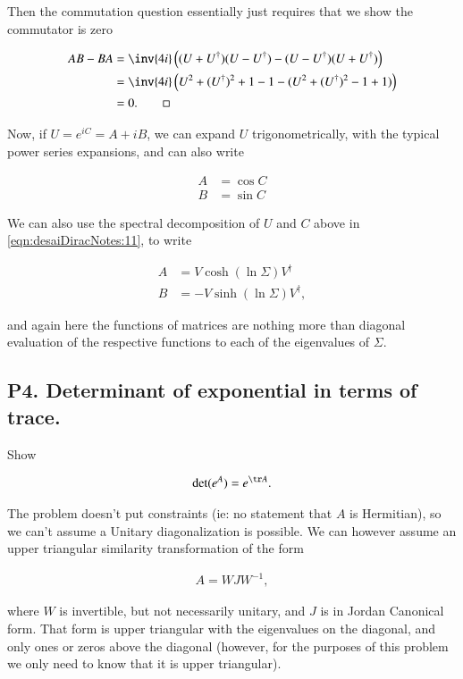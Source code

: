 Then the commutation question essentially just requires that we show the commutator is zero

\begin{align*}
A B - B A 
&=
\inv{4i}\left( 
(U + U^\dagger) (U - U^\dagger)
- (U - U^\dagger) (U + U^\dagger)
\right) \\
&=
\inv{4i}\left( 
U^2 + (U^\dagger)^2 + 1 - 1
- (U^2 + (U^\dagger)^2 - 1 + 1 )
\right) \\
&= 0.\qquad \square
\end{align*}

Now, if $U = e^{iC} = A + iB$, we can expand $U$ trigonometrically, with the typical power series expansions, and can also write

\begin{align*}
A &= \cos C \\
B &= \sin C 
\end{align*}

We can also use the spectral decomposition of $U$ and $C$ above in \ref{eqn:desaiDiracNotes:11}, to write

\begin{align*}
A &= V \cosh(\ln \Sigma) V^\dagger \\
B &= -V \sinh(\ln \Sigma) V^\dagger,
\end{align*}

and again here the functions of matrices are nothing more than diagonal evaluation of the respective functions to each of the eigenvalues of $\Sigma$.

\subsection{P4. Determinant of exponential in terms of trace.}

Show 

\begin{align*}
\det (e^A) = e^{\tr A}.
\end{align*}

The problem doesn't put constraints (ie: no statement that $A$ is Hermitian), so we can't assume a Unitary diagonalization is possible.  We can however assume an upper triangular similarity transformation of the form

\begin{align*}
A = W J W^{-1},
\end{align*}

where $W$ is invertible, but not necessarily unitary, and $J$ is in Jordan Canonical form.  That form is upper triangular with the eigenvalues on the diagonal, and only ones or zeros above the diagonal (however, for the purposes of this problem we only need to know that it is upper triangular).

